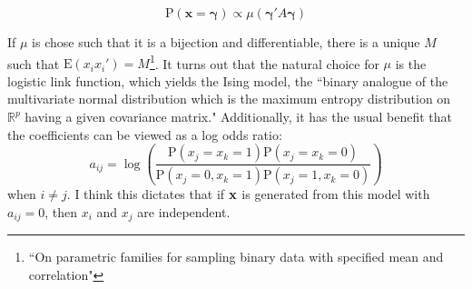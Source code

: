 \documentclass[11pt]{article}
\newcommand{\R}{\mathbb{R}}
\newcommand{\p}{\mathrm{P}}
\newcommand{\E}{\mathrm{E}}
\theoremstyle{definition}
\begin{document}
\[ \p(\mathbf x=\mathbf \gamma) \propto \mu(\mathbf{\gamma}' A\mathbf \gamma)\]

If $\mu$ is chose such that it is a bijection and differentiable, there is a unique $M$ such that $\E(x_ix_i')=M$\footnote{``On parametric families for sampling binary data with specified mean and correlation"}. It turns out that the natural choice for $\mu$ is the logistic link function, which yields the Ising model, the ``binary analogue of the multivariate normal distribution which is the maximum entropy distribution on $\R^p$ having a given covariance matrix." Additionally, it has the usual benefit that the coefficients can be viewed as a log odds ratio:
\[a_{ij} = \log\left(\frac{\p(x_j=x_k=1)\p(x_j=x_k=0)}{\p(x_j=0,x_k=1)\p(x_j=1,x_k=0)}\right) \]
when $i\neq j$. I think this dictates that if $\bf x$ is generated from this model with $a_{ij}=0$, then $x_i$ and $x_j$ are independent.  \par
\end{document}
